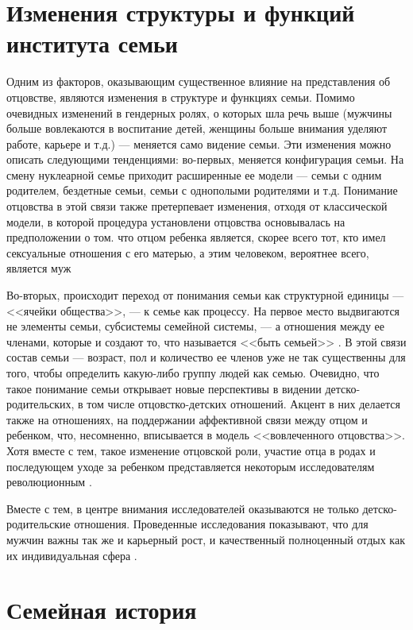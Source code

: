 \documentclass{../../common/thesisbyxetex}
\begin{document}
\section{Изменения структуры и функций института семьи}

Одним из факторов, оказывающим существенное влияние на представления об отцовстве, являются 
изменения в структуре и функциях семьи. Помимо очевидных изменений в гендерных ролях, о которых шла 
речь выше (мужчины больше вовлекаются в воспитание детей, женщины больше внимания уделяют 
работе, 
карьере и т.д.) --- меняется само видение семьи. Эти изменения можно описать следующими 
тенденциями: во-первых, меняется конфигурация семьи. На смену нуклеарной семье приходит расширенные 
ее модели --- семьи с одним родителем, бездетные семьи, семьи с однополыми родителями и т.д. 
Понимание отцовства 
в этой связи также претерпевает изменения, отходя от классической модели, в которой процедура 
установлени отцовства основывалась на предположении о том. что отцом ребенка является, скорее всего 
 тот, кто имел сексуальные отношения с его матерью, а этим человеком, вероятнее всего, 
является муж \cite[318]{legfat}

Во-вторых, происходит переход от понимания семьи как структурной единицы --- <<ячейки общества>>, 
--- к семье как процессу. На первое место выдвигаются не элементы семьи, субсистемы семейной 
системы, --- а отношения между ее членами, которые и создают то, что называется <<быть семьей>> 
\cite{fam}. В этой связи состав семьи --- возраст, пол и количество ее членов уже не так 
существенны для того, чтобы определить какую-либо группу людей как семью. Очевидно, что такое 
понимание семьи открывает новые перспективы в видении детско-родительских, в том числе 
отцовстко-детских отношений. Акцент в них делается также на отношениях, на поддержании аффективной 
связи между отцом и ребенком, что, несомненно,  вписывается в модель <<вовлеченного отцовства>>. 
Хотя вместе с тем, такое изменение отцовской роли, участие отца в родах и последующем уходе за 
ребенком представляется некоторым исследователям 
революционным \cite[15]{fatpsy}.

Вместе с тем, в центре внимания исследователей оказываются не только детско-родительские отношения. 
Проведенные исследования показывают, что для мужчин важны так же и карьерный рост, и качественный 
полноценный отдых как их индивидуальная сфера \cite{mercoh}.


\section{Семейная история}
\end{document}
